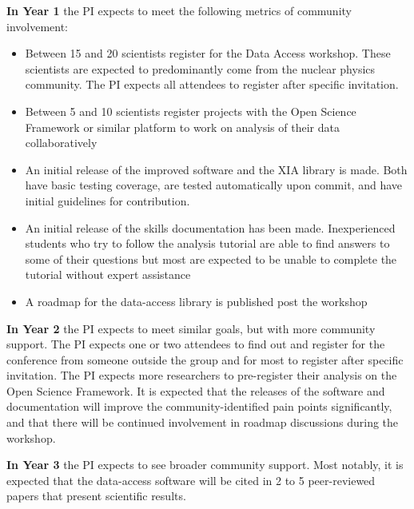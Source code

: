 \textbf{In Year 1}  the PI expects to meet the following metrics of community involvement:
\begin{itemize}
  \item Between 15 and 20 scientists register for the Data Access workshop.  These scientists are expected to predominantly come from the nuclear physics community.  The PI expects all attendees to register after specific invitation.
  \item Between 5 and 10 scientists register projects with the Open Science Framework or similar platform to work on analysis of their data collaboratively
  \item An initial release of the improved software and the XIA library is made.  Both have basic testing coverage, are tested automatically upon commit, and have initial guidelines for contribution.
  \item An initial release of the skills documentation has been made.  Inexperienced students who try to follow the analysis tutorial are able to find answers to some of their questions but most are expected to be unable to complete the tutorial without expert assistance
  \item A roadmap for the data-access  library is published post the workshop
\end{itemize}

\textbf{In Year 2}
the PI expects to meet similar goals, but with more community support.  The PI expects one or two attendees to find out and register for the conference from someone outside the group and for most to register after specific invitation.  The PI expects more researchers to pre-register their analysis on the Open Science Framework.  It is expected that the releases of the software and documentation will improve the community-identified pain points significantly, and that there will be continued involvement in roadmap discussions during the workshop.

\textbf{In Year 3}
the PI expects to see broader community support.  Most notably, it is expected that the data-access software will be cited in 2 to 5 peer-reviewed papers that present scientific results.

